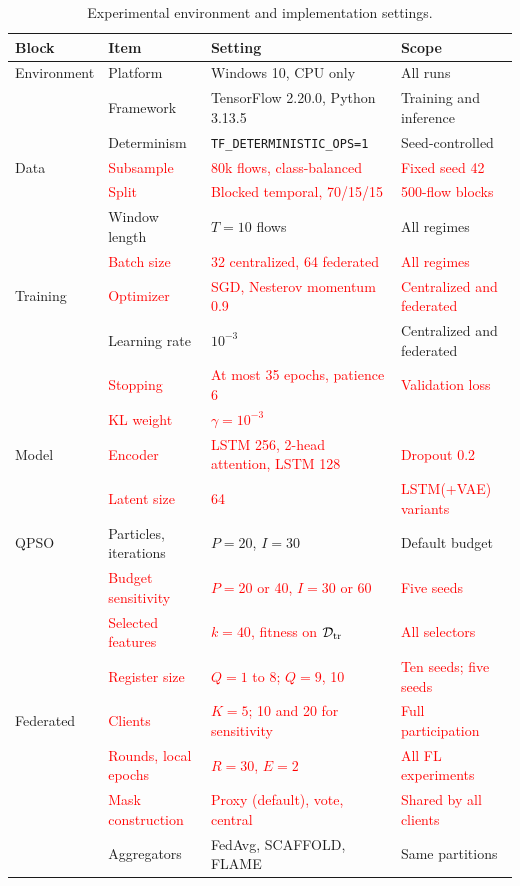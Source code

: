 \documentclass[conference]{IEEEtran}
\begin{document}
\begin{table}[!htbp]
\centering
\caption{Experimental environment and implementation settings.}
\label{tab:impl_setup}
\def\rc#1{\textcolor{red}{#1}}
\setlength{\tabcolsep}{8pt}
\renewcommand{\arraystretch}{1.3}
\begin{tabular}{l l l l}
\hline\toprule
\textbf{Block} & \textbf{Item} & \textbf{Setting} & \textbf{Scope} \\
\hline\toprule
Environment & Platform & Windows 10, CPU only & All runs \\
 & Framework & TensorFlow 2.20.0, Python 3.13.5 & Training and inference \\
 & Determinism & \texttt{TF\_DETERMINISTIC\_OPS=1} & Seed-controlled \\
\midrule
Data & \rc{Subsample} & \rc{80k flows, class-balanced} & \rc{Fixed seed 42} \\
 & \rc{Split} & \rc{Blocked temporal, 70/15/15} & \rc{500-flow blocks} \\
 & Window length & $T=10$ flows & All regimes \\
 & \rc{Batch size} & \rc{32 centralized, 64 federated} & \rc{All regimes} \\
\midrule
Training & \rc{Optimizer} & \rc{SGD, Nesterov momentum 0.9} & \rc{Centralized and federated} \\
 & Learning rate & $10^{-3}$ & Centralized and federated \\
 & \rc{Stopping} & \rc{At most 35 epochs, patience 6} & \rc{Validation loss} \\
 & \rc{KL weight} & \rc{$\gamma=10^{-3}$} & \\
\midrule
Model & \rc{Encoder} & \rc{LSTM 256, 2-head attention, LSTM 128} & \rc{Dropout 0.2} \\
 & \rc{Latent size} & \rc{64} & \rc{LSTM(+VAE) variants} \\
\midrule
QPSO & Particles, iterations & $P=20$, $I=30$ & Default budget \\
 & \rc{Budget sensitivity} & \rc{$P=20$ or 40, $I=30$ or 60} & \rc{Five seeds} \\
 & \rc{Selected features} & \rc{$k=40$, fitness on $\mathcal{D}_{\rm tr}$} & \rc{All selectors} \\
 & \rc{Register size} & \rc{$Q=1$ to 8; $Q=9$, 10} & \rc{Ten seeds; five seeds} \\
\midrule
Federated & \rc{Clients} & \rc{$K=5$; 10 and 20 for sensitivity} & \rc{Full participation} \\
 & \rc{Rounds, local epochs} & \rc{$R=30$, $E=2$} & \rc{All FL experiments} \\
 & \rc{Mask construction} & \rc{Proxy (default), vote, central} & \rc{Shared by all clients} \\
 & Aggregators & FedAvg, SCAFFOLD, FLAME & Same partitions \\
\hline\toprule
\end{tabular}
\end{table}
\end{document}
